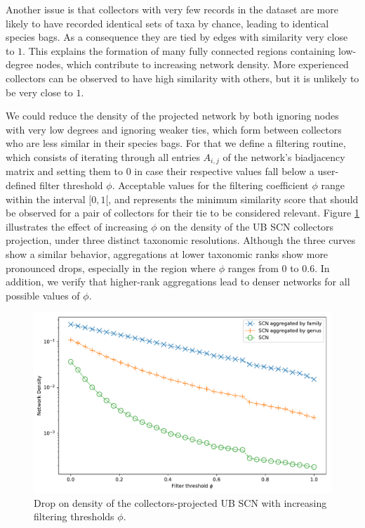 Another issue is that collectors with very few records in the dataset are more likely to have recorded identical sets of taxa by chance, leading to identical species bags.
As a consequence they are tied by edges with similarity very close to $1$.
This explains the formation of many fully connected regions containing low-degree nodes, which contribute to increasing network density.
More experienced collectors can be observed to have high similarity with others, but it is unlikely to be very close to $1$.

We could reduce the density of the projected network by both ignoring nodes with very low degrees and ignoring weaker ties, which form between collectors who are less similar in their species bags.
For that we define a filtering routine, which consists of iterating through all entries $A_{i,j}$ of the network's biadjacency matrix and setting them to $0$ in case their respective values fall below a user-defined filter threshold $\phi$.
Acceptable values for the filtering coefficient $\phi$ range within the interval $[0,1[$, and represents the minimum similarity score that should be observed for a pair of collectors for their tie to be considered relevant.
Figure \ref{fig:ub_scn_projCol_filter_thresh} illustrates the effect of increasing $\phi$ on the density of the UB SCN collectors projection, under three distinct taxonomic resolutions.
Although the three curves show a similar behavior, aggregations at lower taxonomic ranks show more pronounced drops, especially in the region where $\phi$ ranges from $0$ to $0.6$.
In addition, we verify that higher-rank aggregations lead to denser networks for all possible values of $\phi$.

\begin{figure}[!ht]
  	\centering
    \includegraphics[width=0.9\linewidth]{figures/casestudy_ub/scn_projCol_filter_thresh.pdf}
    \caption{ Drop on density of the collectors-projected UB SCN with increasing filtering thresholds $\phi$. }
    \label{fig:ub_scn_projCol_filter_thresh}
\end{figure}


